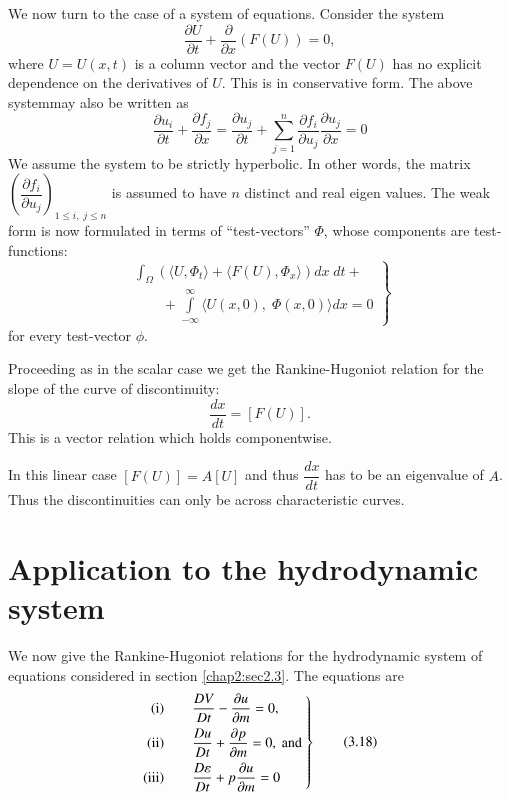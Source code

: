 We now turn to the case of a system of equations. Consider the system
$$
\frac{\partial U}{\partial t} + \frac{\partial}{\partial x} (F(U)) = 0,
$$
where $U = U(x,t)$ is a column vector and the vector $F(U)$ has no
explicit dependence on the derivatives of $U$. This is in conservative
form. The above system\pageoriginale may also be written as
\begin{equation*}
\frac{\partial u_i}{\partial t} + \frac{\partial f_j}{\partial x} =
\frac{\partial u_j}{\partial t} + \sum\limits^n_{j=1} \frac{\partial
  f_i}{\partial u_j} \frac{\partial u_j}{\partial x} = 0\tag{3.15}\label{eq3.15}
\end{equation*}
We assume the system to be strictly hyperbolic. In other words, the
matrix $\left( \dfrac{\partial f_i}{\partial u_j}\right)_{1 \leq i, \;
j \leq n}$ is assumed to have $n$ distinct and real eigen values. The
weak form is now formulated in terms of ``test-vectors'' $\Phi$, whose
components are test-functions:
\begin{equation*}
\left.
\begin{aligned}
\int_\Omega (\langle U, \Phi_t \rangle + \langle F (U), \Phi_x
\rangle)  dx \; dt + \\ 
\qquad + \int\limits^\infty_{-\infty} \langle U (x,0), \; \Phi
(x,0) \rangle dx = 0 
\end{aligned} \right\}
\tag{3.16}\label{eq3.16}
\end{equation*}
for every test-vector $\phi$.

Proceeding as in the scalar case we get the Rankine-Hugoniot relation
for the slope of the curve of discontinuity:
\begin{equation*}
[U] \frac{dx}{dt} = [F(U)]. \tag{3.17}\label{eq3.17}
\end{equation*}
This is a vector relation which holds componentwise.

\begin{remark}\label{chap3:rem3.3}
In this linear case $[F(U)] = A [U]$ and thus $\dfrac{dx}{dt}$ has to
be an eigenvalue of $A$. Thus the discontinuities can only be across
characteristic curves.
\end{remark}


\section{Application to the hydrodynamic system}\label{chap3:sec3.4}
We now give the Rankine-Hugoniot relations for the hydrodynamic system
of equations considered in section \ref{chap2:sec2.3}. The equations are 
\begin{equation*}
\left. 
\begin{aligned}
{\rm (i)} \qquad & \frac{D V}{Dt} - \frac{\partial u}{\partial m} = 0,\\
{\rm (ii)} \qquad & \frac{D u}{Dt} + \frac{\partial p}{\partial m} = 0,
\text{ and }\\
{\rm (iii)} \qquad & \frac{D \varepsilon}{D t}+ p\frac{\partial
  u}{\partial m}  =0
\end{aligned}
\right\}
\tag{3.18} \label{eq3.18}
\end{equation*}\pageoriginale

